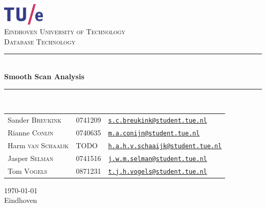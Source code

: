 \documentclass[a4paper,11pt,titlepage]{article}
\author{
	Nicky Advokaat (0740567) - \texttt{n.advokaat@student.tue.nl}
	\and
	Robbert Jongeling (0747896) - \texttt{r.m.jongeling@student.tue.nl}
	\and
	Bram Kohl (0746107) - \texttt{b.j.e.kohl@student.tue.nl}
	\and
	Jasper Selman (0741516) - \texttt{j.w.m.selman@student.tue.nl}
	\and
	Ramon de Vaan (0758873) - \texttt{r.d.vaan@student.tue.nl}
}
\date{\today}
\newcommand{\HRule}{\rule{\linewidth}{0.5mm}}
\newcommand{\uni}{Eindhoven University of Technology}
\newcommand{\vak}{Database Technology}
\newcommand{\essaytitle}{Smooth Scan Analysis}
\newcommand{\stad}{Eindhoven}
\begin{document}
	\begin{center}

		\includegraphics[width=0.15\textwidth]{images/tuelogo}\\[1cm]

		\textsc{\LARGE \uni}\\[1.6cm]


        \textsc{\LARGE \vak}\\[0.5cm]

\HRule \\[0.4cm]
{ \huge \bfseries \essaytitle}\\[0.4cm]

\HRule \\[1.5cm]

    \begin{tabular}{l l l}
	Sander \textsc{Breukink} & 0741209 & \href{mailto:s.c.breukink@student.tue.nl}{\texttt{s.c.breukink@student.tue.nl}}\\
	Rianne \textsc{Conijn} & 0740635 & \href{mailto:m.a.conijn@student.tue.nl}{\texttt{m.a.conijn@student.tue.nl}}\\
	Harm \textsc{van Schaaijk} & TODO & \href{mailto:h.a.h.v.schaaijk@student.tue.nl}{\texttt{h.a.h.v.schaaijk@student.tue.nl}}\\
	Jasper \textsc{Selman} & 0741516 & \href{mailto:j.w.m.selman@student.tue.nl}{\texttt{j.w.m.selman@student.tue.nl}}\\
	Tom \textsc{Vogels} & 0871231 & \href{mailto:t.j.h.vogels@student.tue.nl}{\texttt{t.j.h.vogels@student.tue.nl}}
    \end{tabular}
		\vfill

{\large \today} \\
\stad

	\end{center}

    \newpage
\end{document}
